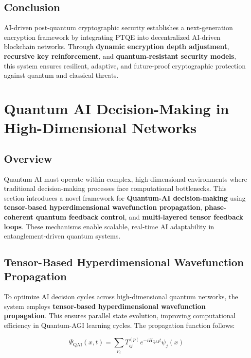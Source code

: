 \documentclass{article}
\theoremstyle{plain}
\begin{document}
\begin{itemize}
\subsection{Conclusion}

AI-driven post-quantum cryptographic security establishes a next-generation encryption framework by integrating PTQE into decentralized AI-driven blockchain networks. Through \textbf{dynamic encryption depth adjustment}, \textbf{recursive key reinforcement}, and \textbf{quantum-resistant security models}, this system ensures resilient, adaptive, and future-proof cryptographic protection against quantum and classical threats.

\section{Quantum AI Decision-Making in High-Dimensional Networks}

\subsection{Overview}

Quantum AI must operate within complex, high-dimensional environments where traditional decision-making processes face computational bottlenecks. This section introduces a novel framework for \textbf{Quantum-AI decision-making} using \textbf{tensor-based hyperdimensional wavefunction propagation}, \textbf{phase-coherent quantum feedback control}, and \textbf{multi-layered tensor feedback loops}. These mechanisms enable scalable, real-time AI adaptability in entanglement-driven quantum systems.

\subsection{Tensor-Based Hyperdimensional Wavefunction Propagation}

To optimize AI decision cycles across high-dimensional quantum networks, the system employs \textbf{tensor-based hyperdimensional wavefunction propagation}. This ensures parallel state evolution, improving computational efficiency in Quantum-AGI learning cycles. The propagation function follows:

\begin{equation}
    \Psi_{\text{QAI}}(x,t) = \sum_{p_i} T_{ij}^{(p)} e^{-i H_{\text{QAI}} t} \psi_j (x)
\end{equation}


\end{itemize}
\end{document}
